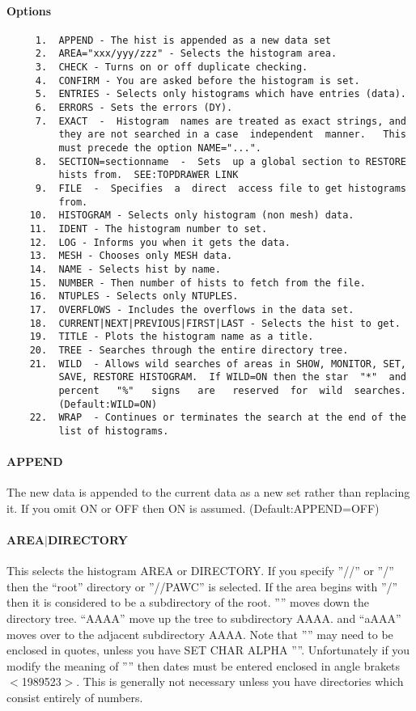 \paragraph{Options}
\begin{verbatim}
     1.  APPEND - The hist is appended as a new data set 
     2.  AREA="xxx/yyy/zzz" - Selects the histogram area.  
     3.  CHECK - Turns on or off duplicate checking.  
     4.  CONFIRM - You are asked before the histogram is set.  
     5.  ENTRIES - Selects only histograms which have entries (data). 
     6.  ERRORS - Sets the errors (DY).  
     7.  EXACT  -  Histogram  names are treated as exact strings, and
         they are not searched in a case  independent  manner.   This
         must precede the option NAME="...".  
     8.  SECTION=sectionname  -  Sets  up a global section to RESTORE
         hists from.  SEE:TOPDRAWER LINK 
     9.  FILE  -  Specifies  a  direct  access file to get histograms
         from.  
    10.  HISTOGRAM - Selects only histogram (non mesh) data.  
    11.  IDENT - The histogram number to set.  
    12.  LOG - Informs you when it gets the data.  
    13.  MESH - Chooses only MESH data.  
    14.  NAME - Selects hist by name.  
    15.  NUMBER - Then number of hists to fetch from the file.  
    16.  NTUPLES - Selects only NTUPLES.  
    17.  OVERFLOWS - Includes the overflows in the data set.  
    18.  CURRENT|NEXT|PREVIOUS|FIRST|LAST - Selects the hist to get. 
    19.  TITLE - Plots the histogram name as a title.  
    20.  TREE - Searches through the entire directory tree.  
    21.  WILD  - Allows wild searches of areas in SHOW, MONITOR, SET,
         SAVE, RESTORE HISTOGRAM.  If WILD=ON then the star  "*"  and
         percent   "%"   signs   are   reserved  for  wild  searches.
         (Default:WILD=ON) 
    22.  WRAP  - Continues or terminates the search at the end of the
         list of histograms.  
\end{verbatim}
\paragraph{APPEND}
The new data is appended to the current data as a new set rather than
replacing  it.   If  you  omit  ON  or  OFF  then  ON   is   assumed.
(Default:APPEND=OFF) 
\paragraph{AREA$|$DIRECTORY}
This selects the histogram AREA or DIRECTORY.  If you specify ''//'' or
''/'' then the ``root'' directory or ''//PAWC'' is selected.  If  the  area
begins  with  ''/''  then  it is considered to be a subdirectory of the
root.  '''' moves down the directory tree.  ``AAAA'' move up the tree  to
subdirectory   AAAA.    and   ``aAAA''   moves  over  to  the  adjacent
subdirectory AAAA.  Note that '''' may need to be enclosed  in  quotes,
unless  you  have SET CHAR ALPHA ''''.  Unfortunately if you modify the
meaning of '''' then dates must be entered enclosed  in  angle  brakets
$<$1989523$>$.    This   is  generally  not  necessary  unless  you  have
directories which consist entirely of numbers.  

